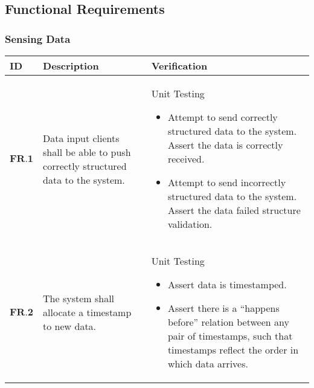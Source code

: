 \subsection{Functional Requirements}
\subsubsection{Sensing Data}
\begin{longtable}[H]{| p{1.5cm} | p{4.5cm} | p{10.5cm} | }
    	\hline
    	\cellcolor{titleColor}\textbf{ID}   & \cellcolor{titleColor}\textbf{Description}                                                              & \cellcolor{titleColor}\textbf{Verification}                                                                                                                                                                                                                                     \\ \hline
    	$\textbf{FR.1}$ & Data input clients shall be able to push correctly structured data to the system. & Unit Testing 
	\begin{itemize} 
	\item Attempt to send correctly structured data to the system. Assert the data is correctly received.
	 \item Attempt to send incorrectly structured data to the system. Assert the data failed structure validation.
	 \end{itemize} \\ \hline
    	$\textbf{FR.2}$ & The system shall allocate a timestamp to new data.                                & Unit Testing\begin{itemize} \item Assert data is timestamped.\item Assert there is a ``happens before'' relation between any pair of timestamps, such that timestamps reflect the order in which data arrives.\end{itemize}\\ \hline
\end{longtable}


